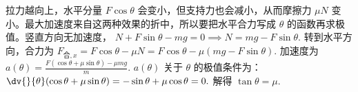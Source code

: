 拉力越向上，水平分量 \(F\cos\theta\) 会变小，但支持力也会减小，从而摩擦力 \(\mu N\) 变小。最大加速度来自这两种效果的折中，所以要把水平合力写成 \(\theta\) 的函数再求极值。竖直方向无加速度，
 \(N+F\sin\theta-mg=0 \implies N=mg-F\sin\theta.\) 
转到水平方向，合力为
 \(F_{\text{合},x}=F\cos\theta-\mu N =F\cos\theta-\mu(mg-F\sin\theta).\) 
加速度为
 \(a(\theta)=\frac{F(\cos\theta+\mu\sin\theta)-\mu mg}{m}.\) 
\(a(\theta)\) 关于 \(\theta\) 的极值条件为：
 \(\dv{}{\theta}(\cos\theta+\mu\sin\theta) =-\sin\theta+\mu\cos\theta=0.\) 
解得
 \(\tan\theta=\mu.\) 
